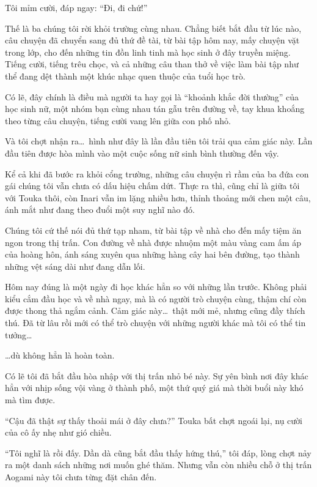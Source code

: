 \documentclass[../main.tex]{subfiles}
\begin{document}
Tôi mỉm cười, đáp ngay: ``Đi, đi chứ!''

Thế là ba chúng tôi rời khỏi trường cùng nhau. Chẳng biết bắt đầu từ lúc nào, câu chuyện đã chuyển sang đủ thứ đề tài, từ bài tập hôm nay, mấy chuyện vặt trong lớp, cho đến những tin đồn linh tinh mà học sinh ở đây truyền miệng. Tiếng cười, tiếng trêu chọc, và cả những câu than thở về việc làm bài tập như thể đang dệt thành một khúc nhạc quen thuộc của tuổi học trò.

Có lẽ, đây chính là điều mà người ta hay gọi là ``khoảnh khắc đời thường'' của học sinh nữ, một nhóm bạn cùng nhau tán gẫu trên đường về, tay khua khoắng theo từng câu chuyện, tiếng cười vang lên giữa con phố nhỏ.

Và tôi chợt nhận ra\dots\ hình như đây là lần đầu tiên tôi trải qua cảm giác này. Lần đầu tiên được hòa mình vào một cuộc sống nữ sinh bình thường đến vậy.

\ct

Kể cả khi đã bước ra khỏi cổng trường, những câu chuyện rì rầm của ba đứa con gái chúng tôi vẫn chưa có dấu hiệu chấm dứt. Thực ra thì, cũng chỉ là giữa tôi với Touka thôi, còn Inari vẫn im lặng nhiều hơn, thỉnh thoảng mới chen một câu, ánh mắt như đang theo đuổi một suy nghĩ nào đó.

Chúng tôi cứ thế nói đủ thứ tạp nham, từ bài tập về nhà cho đến mấy tiệm ăn ngon trong thị trấn. Con đường về nhà được nhuộm một màu vàng cam ấm áp của hoàng hôn, ánh sáng xuyên qua những hàng cây hai bên đường, tạo thành những vệt sáng dài như đang dẫn lối.

Hôm nay đúng là một ngày đi học khác hẳn so với những lần trước. Không phải kiểu cắm đầu học và về nhà ngay, mà là có người trò chuyện cùng, thậm chí còn được thong thả ngắm cảnh. Cảm giác này\dots\ thật mới mẻ, nhưng cũng đầy thích thú. Đã từ lâu rồi mới có thể trò chuyện với những người khác mà tôi có thể tin tưởng\dots

\dots dù không hẳn là hoàn toàn.

Có lẽ tôi đã bắt đầu hòa nhập với thị trấn nhỏ bé này. Sự yên bình nơi đây khác hẳn với nhịp sống vội vàng ở thành phố, một thứ quý giá mà thời buổi này khó mà tìm được.

``Cậu đã thật sự thấy thoải mái ở đây chưa?'' Touka bất chợt ngoái lại, nụ cười của cô ấy nhẹ như gió chiều.

``Tôi nghĩ là rồi đấy. Dần dà cũng bắt đầu thấy hứng thú,'' tôi đáp, lòng chợt nảy ra một danh sách những nơi muốn ghé thăm. Nhưng vẫn còn nhiều chỗ ở thị trấn Aogami này tôi chưa từng đặt chân đến.
\end{document}
